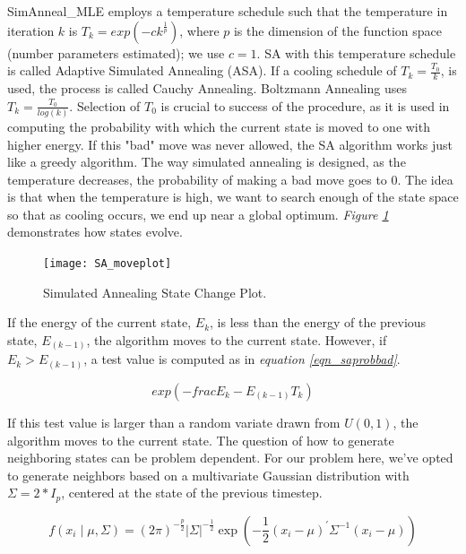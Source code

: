 \documentclass{book}
\newcommand{\textcode}[1]{\textsf{\small #1}}   %
\begin{document}
\textcode{SimAnneal\_MLE} employs a temperature schedule such
that the temperature in iteration $k$ is
$T_k=exp\left(-ck^{\frac{1}{p}} \right)$, where $p$ is the
dimension of the function space (number parameters estimated);
we use $c=1$. SA with this temperature schedule is called
Adaptive Simulated Annealing (ASA). If a cooling schedule of
$T_k=\frac{T_0}{k}$, is used, the process is called Cauchy
Annealing. Boltzmann Annealing uses
$T_k=\frac{T_0}{log\left(k\right)}$. Selection of $T_0$ is
crucial to success of the procedure, as it is used in computing
the probability with which the current state is moved to one
with higher energy. If this "bad" move was never allowed, the
SA algorithm works just like a greedy algorithm. The way
simulated annealing is designed, as the temperature decreases,
the probability of making a bad move goes to $0$. The idea is
that when the temperature is high, we want to search enough of
the state space so that as cooling occurs, we end up near a
global optimum. \emph{Figure \ref{fig_samove}} demonstrates how
states evolve.
\begin{figure}[htbp]
\begin{center}
\texttt{[image: SA\_moveplot]}
\end{center}
\caption{Simulated Annealing State Change Plot.}
\label{fig_samove}
\end{figure}
If the energy of the current state, $E_k$, is less than the
energy of the previous state, $E_(k-1)$, the algorithm moves to
the current state. However, if $E_k > E_(k-1)$, a test value is
computed as in \emph{equation \ref{eqn_saprobbad}}.

\begin{equation}
exp(-frac{E_k - E_(k-1)}{T_k})  \label{eqn_saprobbad}
\end{equation}

If this test value is larger than a random variate drawn from
$U\left(0,1\right)$, the algorithm moves to the current state.
The question of how to generate neighboring states can be
problem dependent. For our problem here, we've opted to
generate neighbors based on a multivariate Gaussian
distribution with $\Sigma=2*I_p$, centered at the state of the
previous timestep.

\begin{equation}
f\left( x_{i}\mid \mu ,\Sigma \right) =\left( 2\pi \right) ^{-\frac{p}{2}%
}\left\vert \Sigma \right\vert ^{-\frac{1}{2}}\exp \left( -\frac{1}{2}\left(
x_{i}-\mu \right) ^{\prime }\Sigma ^{-1}\left( x_{i}-\mu \right) \right)
\label{eqn_multnorm}
\end{equation}
\end{document}

